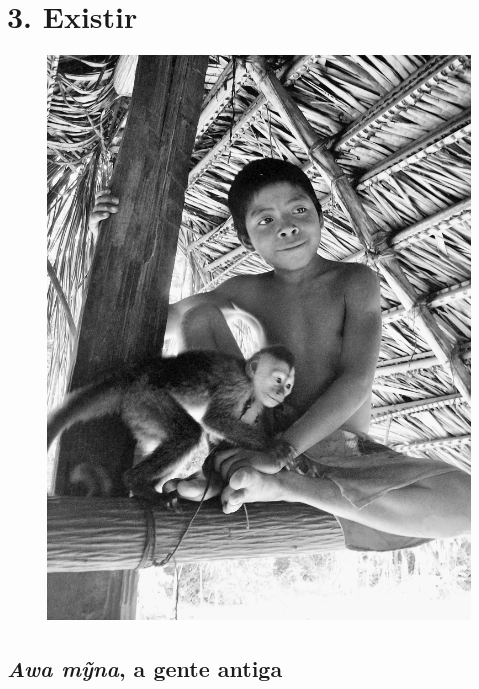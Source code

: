
\chapter{3. Existir}\label{existir}

\begin{figure}[H]
\centering
  \includegraphics[width=\textwidth]{./imgs/100_4768}
\end{figure}

\section{\emph{Awa mỹna}, a gente antiga}\label{awa-mux1ef9na-a-gente-antiga}


